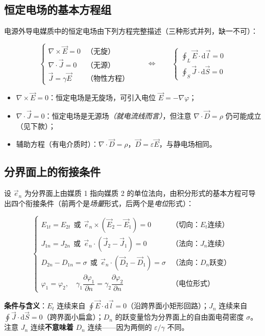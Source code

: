 \subsection{恒定电场的基本方程组}
电源外导电媒质中的恒定电场由下列方程完整描述（三种形式并列，缺一不可）：
\begin{formulaBox}
\[
\begin{cases}
\nabla\times\vec{E}=0 & \text{（无旋）}\\[2pt]
\nabla\cdot\vec{J}=0 & \text{（无源）}\\[2pt]
\vec{J}=\gamma\vec{E} & \text{（物性方程）}
\end{cases}
\qquad\Longleftrightarrow\qquad
\begin{cases}
\displaystyle\oint_L \vec{E}\cdot\mathrm{d}\vec{l}=0\\[6pt]
\displaystyle\oint_S \vec{J}\cdot\mathrm{d}\vec{S}=0
\end{cases}
\]
\end{formulaBox}
\begin{itemize}
  \item $\nabla\times\vec{E}=0$：恒定电场是无旋场，可引入电位 $\vec{E}=-\nabla\varphi$；
  \item $\nabla\cdot\vec{J}=0$：恒定电场是无源场\emph{（就电流线而言）}，但注意 $\nabla\cdot\vec{D}=\rho$ 仍可能成立（见下款）；
  \item 辅助方程（有电介质时）：$\nabla\cdot\vec{D}=\rho$，$\vec{D}=\varepsilon\vec{E}$，与静电场相同。
\end{itemize}

\subsection{分界面上的衔接条件}
设 $\vec{e}_n$ 为分界面上由媒质 1 指向媒质 2 的单位法向，由积分形式的基本方程可导出四个衔接条件（前两个是\emph{场量}形式，后两个是\emph{电位}形式）：
\begin{formulaBox}
\[
\begin{cases}
E_{1t}=E_{2t}\ \ \text{或}\ \ \vec{e}_n\times(\vec{E}_2-\vec{E}_1)=0 & \text{（切向：}E_t\text{连续）}\\[4pt]
J_{1n}=J_{2n}\ \ \text{或}\ \ \vec{e}_n\cdot(\vec{J}_2-\vec{J}_1)=0 & \text{（法向：}J_n\text{连续）}\\[4pt]
D_{2n}-D_{1n}=\sigma\ \ \text{或}\ \ \vec{e}_n\cdot(\vec{D}_2-\vec{D}_1)=\sigma & \text{（法向：}D_n\text{跃变）}\\[4pt]
\varphi_1=\varphi_2,\quad \gamma_1\dfrac{\partial\varphi_1}{\partial n}=\gamma_2\dfrac{\partial\varphi_2}{\partial n} & \text{（电位形式）}
\end{cases}
\]
\end{formulaBox}
\textbf{条件与含义}：$E_t$ 连续来自 $\oint\vec{E}\cdot\mathrm{d}\vec{l}=0$（沿跨界面小矩形回路）；$J_n$ 连续来自 $\oint\vec{J}\cdot\mathrm{d}\vec{S}=0$（跨界面小扁盒）；$D_n$ 的跃变量恰为分界面上的自由面电荷密度 $\sigma$。注意 $J_n$ 连续\textbf{不意味着} $D_n$ 连续——因为两侧的 $\varepsilon/\gamma$ 不同。


